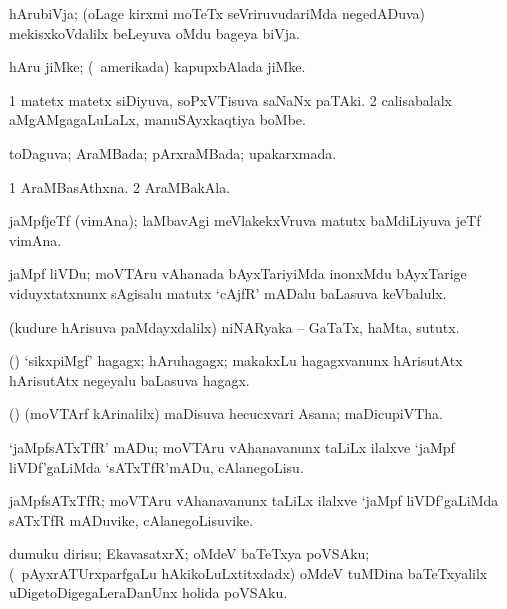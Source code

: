 \bentry
{}
\gl{\nA}
\bmng
hArubiVja; (oLage kirxmi moTeTx seVriruvudariMda negedADuva) mekisxkoVdalilx beLeyuva oMdu bageya biVja. 
\emng
\eentry

\bentry
{}
\gl{\nA}
\bmng
hAru jiMke; (\kanu\ amerikada) kapupxbAlada jiMke. 
\emng
\eentry

\bentry
{}
\gl{\nA}
\bmng
\bnum
\num{1} matetx matetx siDiyuva, soPxVTisuva saNaNx paTAki. 
\num{2} calisabalalx aMgAMgagaLuLaLx, manuSAyxkaqtiya boMbe. 
\enum
\emng
\eentry

\bentry
{}
\gl{\gu}
\bmng
toDaguva; AraMBada; pArxraMBada; upakarxmada. 
\emng

\noindent
\gl{\pagu}
\bmng
\bnum
\num{1}   AraMBasAthxna. 
\num{2}  AraMBakAla. 
\enum
\emng
\eentry

\bentry
{}
\gl{\nA}
\bmng
jaMpfjeTf (vimAna); laMbavAgi meVlakekxVruva matutx baMdiLiyuva jeTf vimAna. 
\emng
\eentry

\bentry
{}
\gl{\nA}
\bmng
jaMpf liVDu; moVTAru vAhanada bAyxTariyiMda inonxMdu bAyxTarige viduyxtatxnunx sAgisalu matutx `cAjfR' mADalu baLasuva keVbalulx. 
\emng
\eentry

\bentry
{}
\gl{\nA}
\bmng
(kudure hArisuva paMdayxdalilx) niNARyaka -- GaTaTx, haMta, sututx. 
\emng
\eentry

\bentry
{}
\gl{\nA}
\bmng
(\ame) `sikxpiMgf' hagagx; hAruhagagx; makakxLu hagagxvanunx hArisutAtx hArisutAtx negeyalu baLasuva hagagx. 
\emng
\eentry

\bentry
{}
\gl{\nA}
\bmng
(\ame) (moVTArf kArinalilx) maDisuva hecucxvari Asana; maDicupiVTha. 
\emng
\eentry

\bentry
{}
\gl{\sakirx}
\bmng
`jaMpfsATxTfR' mADu; moVTAru vAhanavanunx taLiLx ilalxve `jaMpf liVDf'gaLiMda `sATxTfR'mADu, cAlanegoLisu. 
\emng
\eentry

\bentry
{}
\gl{\nA}
\bmng
jaMpfsATxTfR; moVTAru vAhanavanunx taLiLx ilalxve `jaMpf liVDf'gaLiMda sATxTfR mADuvike, cAlanegoLisuvike. 
\emng
\eentry


\bentry
{}
\gl{\nA}
\bmng
dumuku dirisu; EkavasatxrX; oMdeV baTeTxya poVSAku; (\sA\ pAyxrATUrxparfgaLu hAkikoLuLxtitxdadx) oMdeV tuMDina baTeTxyalilx uDigetoDigegaLeraDanUnx holida poVSAku. 
\emng
\eentry

